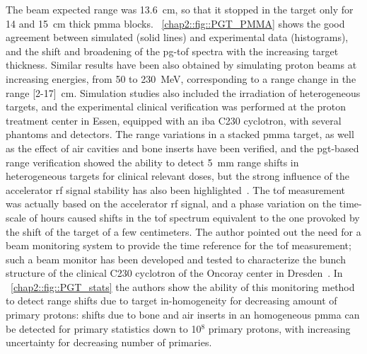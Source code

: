 The beam expected range was 13.6~cm, so that it stopped in the target only for 14 and 15~cm thick \gls{pmma} blocks. \figurename~\ref{chap2::fig::PGT_PMMA} shows the good agreement between simulated (solid lines) and experimental data (histograms), and the shift and broadening of the \gls{pg}-\gls{tof} spectra with the increasing target thickness. Similar results have been also obtained by simulating proton beams at increasing energies, from 50 to 230~MeV, corresponding to a range change in the range [2-17]~cm. Simulation studies also included the irradiation of heterogeneous targets, and the experimental clinical verification was performed at the proton treatment center in Essen, equipped with an \gls{iba} C230 cyclotron, with several phantoms and detectors. The range variations in a stacked \gls{pmma} target, as well as the effect of air cavities and bone inserts have been verified, and the \gls{pgt}-based range verification showed the ability to detect 5~mm range shifts in heterogeneous targets for clinical relevant doses, but the strong influence of the accelerator \gls{rf} signal stability has also been highlighted~\parencite{HuesoGonzalez2015b}. The \gls{tof} measurement was actually based on the accelerator \gls{rf} signal, and a phase variation on the time-scale of hours caused shifts in the \gls{tof} spectrum equivalent to the one provoked by the shift of the target of a few centimeters. The author pointed out the need for a beam monitoring system to provide the time reference for the \gls{tof} measurement; such a beam monitor has been developed and tested to characterize the bunch structure of the clinical C230 cyclotron of the Oncoray center in Dresden~\parencite{Petzoldt2016}. 
In \figurename~\ref{chap2::fig::PGT_stats} the authors show the ability of this monitoring method to detect range shifts due to target in-homogeneity for decreasing amount of primary protons: shifts due to bone and air inserts in an homogeneous \gls{pmma} can be detected for primary statistics down to 10$^8$ primary protons, with increasing uncertainty for decreasing number of primaries.  

